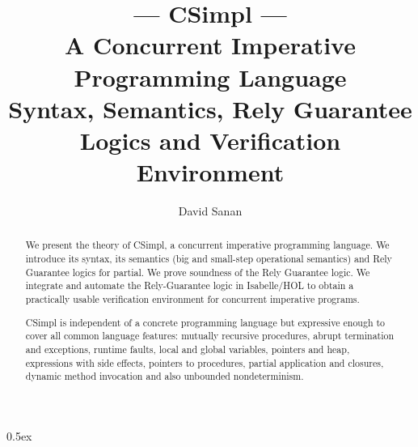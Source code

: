 \documentclass[11pt,a4paper]{article}
\begin{document}
\title{--- \textbf{CSimpl} --- \\
       A Concurrent Imperative Programming Language\\  
       Syntax, Semantics, Rely Guarantee Logics and Verification Environment}
\author{David Sanan}

\begin{abstract}
We present the theory of CSimpl, a concurrent imperative programming language.
We introduce its syntax, its semantics (big and small-step operational
semantics) and Rely Guarantee logics for partial. 
We prove soundness of the Rely Guarantee logic. We
integrate and automate the Rely-Guarantee logic in Isabelle/HOL to obtain a
practically usable verification environment for concurrent imperative programs.

CSimpl is independent of a concrete programming language but expressive
enough to cover all common language features: mutually recursive
procedures, abrupt termination and exceptions, runtime faults, local
and global variables, pointers and heap, expressions with side
effects, pointers to procedures, partial application and closures,
dynamic method invocation and also unbounded nondeterminism.  
\end{abstract}

\maketitle

\tableofcontents
\parindent 0pt\parskip 0.5ex

\pagebreak

\begin{center}
  \end{center}

\pagebreak




\end{document}
